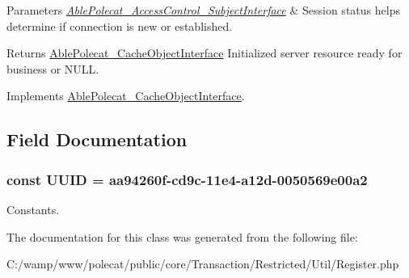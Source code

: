 \begin{DoxyParams}{Parameters}
{\em \hyperlink{interface_able_polecat___access_control___subject_interface}{Able\+Polecat\+\_\+\+Access\+Control\+\_\+\+Subject\+Interface}} & Session status helps determine if connection is new or established.\\
\hline
\end{DoxyParams}
\begin{DoxyReturn}{Returns}
\hyperlink{interface_able_polecat___cache_object_interface}{Able\+Polecat\+\_\+\+Cache\+Object\+Interface} Initialized server resource ready for business or N\+U\+L\+L. 
\end{DoxyReturn}


Implements \hyperlink{interface_able_polecat___cache_object_interface_a3f2135f6ad45f51d075657f6d20db2cd}{Able\+Polecat\+\_\+\+Cache\+Object\+Interface}.



\subsection{Field Documentation}
\hypertarget{class_able_polecat___transaction___restricted___util___register_a74b892c8c0b86bf9d04c5819898c51e7}{}
\subsubsection[{U\+U\+I\+D}]{\setlength{\rightskip}{0pt plus 5cm}const U\+U\+I\+D = \textquotesingle{}aa94260f-\/cd9c-\/11e4-\/a12d-\/0050569e00a2\textquotesingle{}}\label{class_able_polecat___transaction___restricted___util___register_a74b892c8c0b86bf9d04c5819898c51e7}
Constants. 

The documentation for this class was generated from the following file\+:\begin{DoxyCompactItemize}
\item 
C\+:/wamp/www/polecat/public/core/\+Transaction/\+Restricted/\+Util/Register.\+php\end{DoxyCompactItemize}
